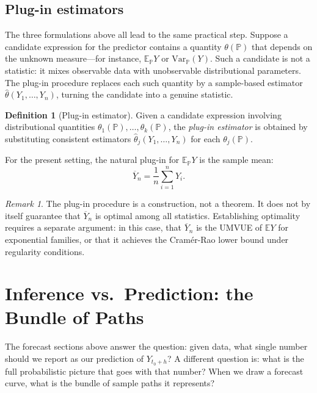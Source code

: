 \documentclass[a4paper,oneside,12pt]{extarticle}
\theoremstyle{plain}
\theoremstyle{definition}
\newtheorem{definition}[proposition]{Definition}
\theoremstyle{remark}
\newtheorem{remark}[proposition]{Remark}
\newcommand*{\E}{\mathbb{E}}
\newcommand*{\mP}{\mathbb{P}}
\begin{document}
\subsection{Plug-in estimators}

The three formulations above all lead to the same practical step. Suppose
a candidate expression for the predictor contains a quantity
$\theta(\mP)$ that depends on the unknown measure---for instance,
$\E_\mP Y$ or $\mathrm{Var}_\mP(Y)$. Such a candidate is not a
statistic: it mixes observable data with unobservable distributional
parameters. The plug-in procedure replaces each such quantity by a
sample-based estimator $\widehat\theta(Y_1,\ldots,Y_n)$, turning the
candidate into a genuine statistic.

\begin{definition}[Plug-in estimator]
Given a candidate expression involving distributional quantities
$\theta_1(\mP),\ldots,\theta_k(\mP)$, the \emph{plug-in estimator}
is obtained by substituting consistent estimators
$\widehat\theta_j(Y_1,\ldots,Y_n)$ for each $\theta_j(\mP)$.
\end{definition}

For the present setting, the natural plug-in for $\E_\mP Y$ is the
sample mean:
\[
\overline{Y}_n = \frac{1}{n}\sum_{i=1}^n Y_i.
\]

\begin{remark}
The plug-in procedure is a construction, not a theorem. It does not by
itself guarantee that $\overline{Y}_n$ is optimal among all statistics.
Establishing optimality requires a separate argument: in this case, that
$\overline{Y}_n$ is the UMVUE of $\E Y$ for exponential families, or that
it achieves the Cramér-Rao lower bound under regularity conditions.
\end{remark}


\section{Inference vs.\ Prediction: the Bundle of Paths}
\label{sec:inference_vs_prediction}

The forecast sections above answer the question: given data, what single
number should we report as our prediction of $Y_{t_0+h}$?
A different question is: what is the full probabilistic picture that goes
with that number? When we draw a forecast curve, what is the bundle of
sample paths it represents?
\end{document}
